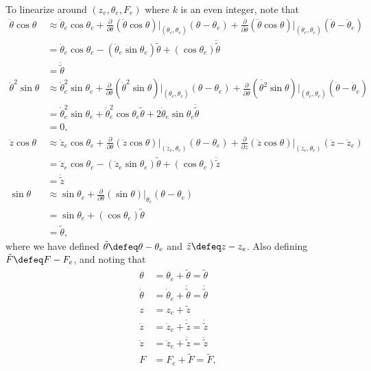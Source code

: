 To linearize around $(z_e, \theta_e, F_e)$ where $k$ is an even integer, note that
\begin{align*}
\ddot{\theta}\cos\theta &\approx 
	\ddot{\theta}_e\cos\theta_e
		+ \frac{\partial}{\partial\theta}(\ddot{\theta}\cos\theta)\Big|_{(\ddot{\theta}_e,\theta_e)}(\theta-\theta_e)
		+ \frac{\partial}{\partial\ddot{\theta}}(\ddot{\theta}\cos\theta)\Big|_{(\ddot{\theta}_e,\theta_e)}(\ddot{\theta}-\ddot{\theta}_e) \\
		&= \ddot{\theta}_e\cos\theta_e
		- (\ddot{\theta}_e\sin\theta_e)\tilde{\theta}
		+ (\cos\theta_e)\ddot{\tilde{\theta}} \\
		&= \ddot{\tilde{\theta}} \\
%
\dot{\theta}^2\sin\theta &\approx \dot{\theta}_e^2\sin\theta_e + \frac{\partial}{\partial\theta}(\dot{\theta}^2\sin\theta)\Big|_{(\theta_e,\dot{\theta}_e)}(\theta-\theta_e) 
	+ \frac{\partial}{\partial\dot{\theta}}(\dot{\theta^2}\sin\theta)\Big|_{(\theta_e,\dot{\theta}_e)}(\dot{\theta}-\dot{\theta}_e) \\
&= \dot{\theta}_e^2\sin\theta_e + \dot{\theta}_e^2\cos\theta_e\tilde{\theta} + 2\dot{\theta}_e\sin\theta_e\dot{\tilde{\theta}} \\
&= 0, \\
%
\ddot{z}\cos\theta &\approx 
	\ddot{z}_e\cos\theta_e
		+ \frac{\partial}{\partial\theta}(\ddot{z}\cos\theta)\Big|_{(\ddot{z}_e,\theta_e)}(\theta-\theta_e)
		+ \frac{\partial}{\partial\ddot{z}}(\ddot{z}\cos\theta)\Big|_{(\ddot{z}_e,\theta_e)}(\ddot{z}-\ddot{z}_e) \\
		&= \ddot{z}_e\cos\theta_e
		- (\ddot{z}_e\sin\theta_e)\tilde{\theta}
		+ (\cos\theta_e)\ddot{\tilde{z}} \\
		&= \ddot{\tilde{z}} \\
%
\sin\theta &\approx \sin\theta_e + \frac{\partial}{\partial \theta}
(\sin\theta)\Big|_{\theta_e} 
(\theta-\theta_e) \\
	&= \sin\theta_e + (\cos\theta_e) \tilde{\theta} \\
	&= \tilde{\theta},
\end{align*}
where we have defined
$\tilde{\theta}\defeq\theta-\theta_e$ and $\tilde{z}\defeq z-z_e$.  Also defining $\tilde{F}\defeq F-F_e$, and noting that
\begin{align*}
\theta &= \theta_e + \tilde{\theta} = \tilde{\theta} \\
\dot{\theta} &= \dot{\theta}_e + \dot{\tilde{\theta}} = \dot{\tilde{\theta}} \\
z &= z_e + \tilde{z} \\
\dot{z} &= \dot{z}_e + \dot{\tilde{z}} = \dot{\tilde{z}} \\
\ddot{z} &= \ddot{z}_e + \ddot{\tilde{z}} = \ddot{\tilde{z}} \\
F &= F_e + \tilde{F} = \tilde{F},
\end{align*}
